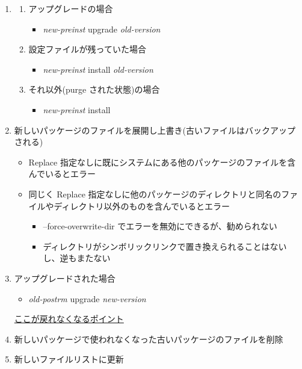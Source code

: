 \documentclass[mingoth,a4paper]{jsarticle}
\begin{document}
\begin{enumerate}
\item
  \begin{enumerate}
  \item アップグレードの場合
    \begin{itemize}
    \item {\it new-preinst} upgrade {\it old-version}
    \end{itemize}
  \item 設定ファイルが残っていた場合
    \begin{itemize}
    \item {\it new-preinst} install {\it old-version}
    \end{itemize}
  \item それ以外(purge された状態)の場合
    \begin{itemize}
    \item {\it new-preinst} install
    \end{itemize}
  \end{enumerate}

\item 新しいパッケージのファイルを展開し上書き(古いファイルはバックアップされる)
  \begin{itemize}
  \item Replace 指定なしに既にシステムにある他のパッケージのファイルを含んでいるとエラー
  \item 同じく Replace 指定なしに他のパッケージのディレクトリと同名のファイルやディレクトリ以外のものを含んでいるとエラー
    \begin{itemize}
    \item --force-overwrite-dir でエラーを無効にできるが、勧められない
    \item ディレクトリがシンボリックリンクで置き換えられることはないし、逆もまたない
    \end{itemize}
  \end{itemize}

\item アップグレードされた場合
  \begin{itemize}
  \item {\it old-postrm} upgrade {\it new-version}
  \end{itemize}

{\underline {\Large ここが戻れなくなるポイント}}


\item 新しいパッケージで使われなくなった古いパッケージのファイルを削除

\item 新しいファイルリストに更新


\end{enumerate}
\end{document}
